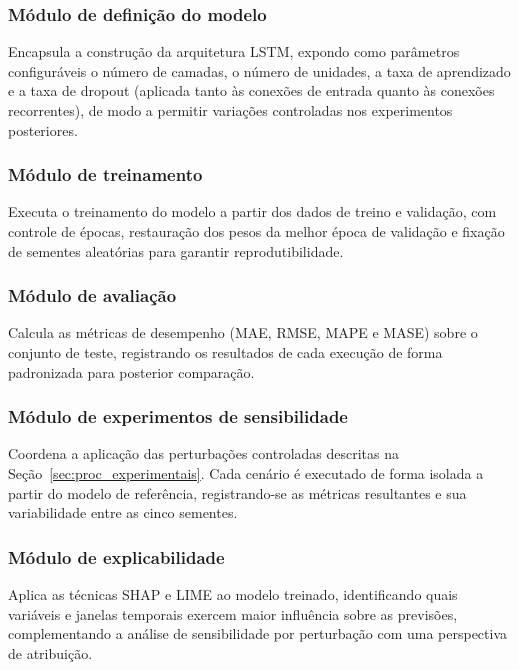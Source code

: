 \documentclass[
    12pt,
    openright,
    oneside,
    a4paper,
    english,
    brazil
]{abntex2}
\begin{document}
\subsubsection{Módulo de definição do modelo}

Encapsula a construção da arquitetura LSTM, expondo como parâmetros configuráveis o número de camadas, o número de unidades, a taxa de aprendizado e a taxa de dropout (aplicada tanto às conexões de entrada quanto às conexões recorrentes), de modo a permitir variações controladas nos experimentos posteriores.

\subsubsection{Módulo de treinamento}

Executa o treinamento do modelo a partir dos dados de treino e validação, com controle de épocas, restauração dos pesos da melhor época de validação e fixação de sementes aleatórias para garantir reprodutibilidade.

\subsubsection{Módulo de avaliação}

Calcula as métricas de desempenho (MAE, RMSE, MAPE e MASE) sobre o conjunto de teste, registrando os resultados de cada execução de forma padronizada para posterior comparação.

\subsubsection{Módulo de experimentos de sensibilidade}

Coordena a aplicação das perturbações controladas descritas na Seção~\ref{sec:proc_experimentais}. Cada cenário é executado de forma isolada a partir do modelo de referência, registrando-se as métricas resultantes e sua variabilidade entre as cinco sementes.

\subsubsection{Módulo de explicabilidade}

Aplica as técnicas SHAP e LIME ao modelo treinado, identificando quais variáveis e janelas temporais exercem maior influência sobre as previsões, complementando a análise de sensibilidade por perturbação com uma perspectiva de atribuição.
\end{document}
